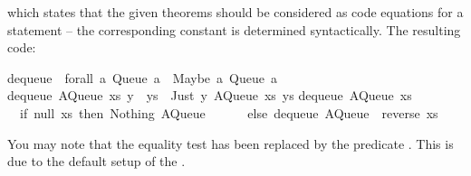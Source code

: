 \begin{isabellebody}
\begin{isamarkuptext}
  which states that the given theorems should be considered as code
  equations for a  statement -- the corresponding constant
  is determined syntactically.  The resulting code:%
\end{isamarkuptext}%
\isamarkuptrue%
%
\isadelimquotetypewriter
%
\endisadelimquotetypewriter
%
\isatagquotetypewriter
%
\begin{isamarkuptext}%
dequeue\ {}{}\ forall\ a{}\ Queue\ a\ {}{}\ {}Maybe\ a{}\ Queue\ a{}{}\isanewline
dequeue\ {}AQueue\ xs\ {}y\ {}\ ys{}{}\ {}\ {}Just\ y{}\ AQueue\ xs\ ys{}{}\isanewline
dequeue\ {}AQueue\ xs\ {}{}{}\ {}\isanewline
\ \ {}if\ null\ xs\ then\ {}Nothing{}\ AQueue\ {}{}\ {}{}{}\isanewline
\ \ \ \ else\ dequeue\ {}AQueue\ {}{}\ {}reverse\ xs{}{}{}{}\isanewline%
\end{isamarkuptext}%
\isamarkuptrue%
%
\endisatagquotetypewriter
{\isafoldquotetypewriter}%
%
\isadelimquotetypewriter
%
\endisadelimquotetypewriter
%
\begin{isamarkuptext}%
\noindent You may note that the equality test  has
  been replaced by the predicate .  This is due
  to the default setup of the .


\end{isamarkuptext}
\end{isabellebody}
